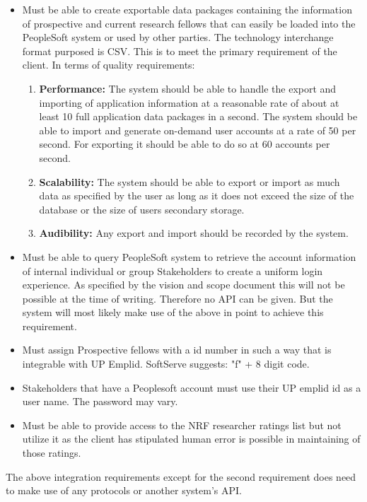 \documentclass[12pt]{article}
\begin{document}
\begin{itemize}
	\item Must be able to create exportable data packages containing the information of prospective and current research fellows that can easily be loaded into the PeopleSoft system or used by other parties. The technology interchange format purposed is CSV. This is to meet the primary requirement of the client. In terms of quality requirements:
	\begin{enumerate}
		\item \textbf{Performance:} The system should be able to handle the export and importing of application information at a reasonable rate of about at least 10 full application data packages in a second. The system should be able to import and generate on-demand user accounts at a rate of 50 per second. For exporting it should be able to do so at 60 accounts per second.
		\item \textbf{Scalability:} The system should be able to export or import as much data as specified by the user as long as it does not exceed the size of the database or the size of users secondary storage. 
		\item \textbf{Audibility:} Any export and import should be recorded by the system.
	\end{enumerate}  
	\item Must be able to query PeopleSoft system to retrieve the account information of internal individual or group Stakeholders to create a uniform login experience. As specified by the vision and scope document this will not be possible at the time of writing. Therefore no API can be given. But the system will most likely make use of the above in point to achieve this requirement. 
	\item Must assign Prospective fellows with a id number in such a way that is integrable with UP Emplid. SoftServe suggests: "f" + 8 digit code.
	\item Stakeholders that have a Peoplesoft account must use their UP emplid id as a user name. The password may vary.
	\item Must be able to provide access to the NRF researcher ratings list but not utilize it as the client has stipulated human error is possible in maintaining of those ratings.
\end{itemize}

The above integration requirements except for the second requirement does need to make use of any protocols or another system's API.
\end{document}
